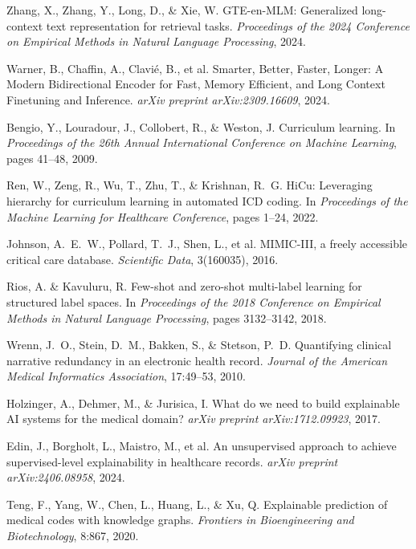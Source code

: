 \documentclass[12pt,a4paper]{report}
\begin{document}
\begin{thebibliography}{99}
Zhang, X., Zhang, Y., Long, D., \& Xie, W.
\newblock GTE-en-MLM: Generalized long-context text representation for retrieval tasks.
\newblock \emph{Proceedings of the 2024 Conference on Empirical Methods in Natural Language Processing}, 2024.

Warner, B., Chaffin, A., Clavié, B., et al.
\newblock Smarter, Better, Faster, Longer: A Modern Bidirectional Encoder for Fast, Memory Efficient, and Long Context Finetuning and Inference.
\newblock \emph{arXiv preprint arXiv:2309.16609}, 2024.

Bengio, Y., Louradour, J., Collobert, R., \& Weston, J.
\newblock Curriculum learning.
\newblock In \emph{Proceedings of the 26th Annual International Conference on Machine Learning}, pages 41--48, 2009.

Ren, W., Zeng, R., Wu, T., Zhu, T., \& Krishnan, R.~G.
\newblock HiCu: Leveraging hierarchy for curriculum learning in automated ICD coding.
\newblock In \emph{Proceedings of the Machine Learning for Healthcare Conference}, pages 1--24, 2022.

Johnson, A.~E.~W., Pollard, T.~J., Shen, L., et al.
\newblock MIMIC-III, a freely accessible critical care database.
\newblock \emph{Scientific Data}, 3(160035), 2016.

Rios, A. \& Kavuluru, R.
\newblock Few-shot and zero-shot multi-label learning for structured label spaces.
\newblock In \emph{Proceedings of the 2018 Conference on Empirical Methods in Natural Language Processing}, pages 3132--3142, 2018.

Wrenn, J.~O., Stein, D.~M., Bakken, S., \& Stetson, P.~D.
\newblock Quantifying clinical narrative redundancy in an electronic health record.
\newblock \emph{Journal of the American Medical Informatics Association}, 17:49--53, 2010.

Holzinger, A., Dehmer, M., \& Jurisica, I.
\newblock What do we need to build explainable AI systems for the medical domain?
\newblock \emph{arXiv preprint arXiv:1712.09923}, 2017.

Edin, J., Borgholt, L., Maistro, M., et al.
\newblock An unsupervised approach to achieve supervised-level explainability in healthcare records.
\newblock \emph{arXiv preprint arXiv:2406.08958}, 2024.

Teng, F., Yang, W., Chen, L., Huang, L., \& Xu, Q.
\newblock Explainable prediction of medical codes with knowledge graphs.
\newblock \emph{Frontiers in Bioengineering and Biotechnology}, 8:867, 2020.


\end{thebibliography}
\end{document}
